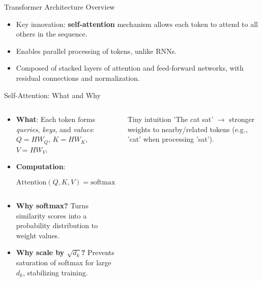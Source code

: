 \documentclass[aspectratio=169]{beamer}
\begin{document}
\begin{frame}{Transformer Architecture Overview}
  \begin{itemize}
    \item Key innovation: \textbf{self-attention} mechanism allows each token to attend to all others in the sequence.
    \item Enables parallel processing of tokens, unlike RNNs.
    \item Composed of stacked layers of attention and feed-forward networks, with residual connections and normalization.
  \end{itemize}
\end{frame}




\begin{frame}{Self-Attention: What and Why}
  \begin{columns}[T,onlytextwidth]
    \begin{column}{0.6\linewidth}
      \begin{itemize}
        \item \textbf{What}: Each token forms \emph{queries}, \emph{keys}, and \emph{values}: $Q = HW_Q$, $K = HW_K$, $V = HW_V$.
        \item \textbf{Computation}: 
          \[ \text{Attention}(Q,K,V) = \text{softmax}\left(\frac{QK^T}{\sqrt{d_k}}\right)V. \]
        \item \textbf{Why softmax?} Turns similarity scores into a probability distribution to weight values.
        \item \textbf{Why scale by $\sqrt{d_k}$?} Prevents saturation of softmax for large $d_k$, stabilizing training.
         \end{itemize}
    \end{column}
    \begin{column}{0.3\linewidth}
      \begin{exampleblock}{Tiny intuition}
        'The cat sat' $\to$ stronger weights to nearby/related tokens (e.g., 'cat' when processing 'sat').
      \end{exampleblock}
    \end{column}
  \end{columns}
\end{frame}
\end{document}
